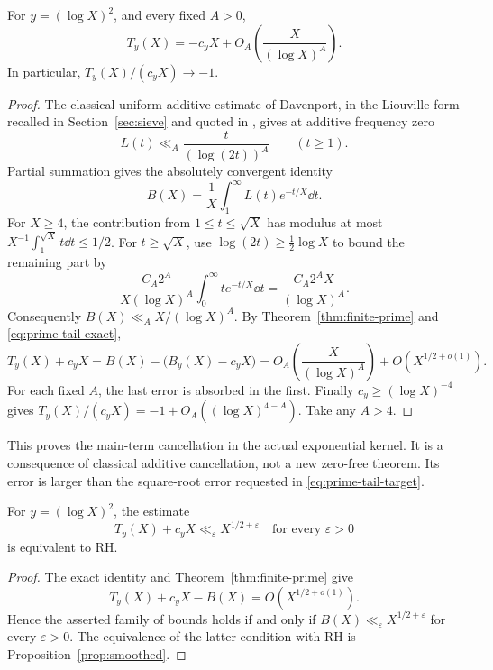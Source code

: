\begin{proposition}
\label{prop:prime-tail-logarithmic}
For \(y=(\log X)^2\), and every fixed \(A>0\),
\[
 T_y(X)=-c_yX+O_A\!\left(\frac{X}{(\log X)^A}\right).
\]
In particular, \(T_y(X)/(c_yX)\to-1\).
\end{proposition}
\begin{proof}
The classical uniform additive estimate of Davenport, in the
Liouville form recalled in Section~\ref{sec:sieve} and quoted in
\cite{mrt}, gives at additive frequency zero
\[
 L(t)\ll_A \frac{t}{(\log(2t))^A}
 \qquad(t\ge1).
\]
Partial summation gives the absolutely convergent identity
\[
 B(X)=\frac1X\int_1^\infty L(t)e^{-t/X}\dd t.
\]
For \(X\ge4\), the contribution from \(1\le t\le\sqrt X\)
has modulus at most \(X^{-1}\int_1^{\sqrt X}t\dd t\le1/2\).
For \(t\ge\sqrt X\), use
\(\log(2t)\ge\tfrac12\log X\) to bound the remaining part by
\[
 \frac{C_A2^A}{X(\log X)^A}
     \int_0^\infty te^{-t/X}\dd t
 =\frac{C_A2^AX}{(\log X)^A}.
\]
Consequently \(B(X)\ll_A X/(\log X)^A\).
By Theorem~\ref{thm:finite-prime} and
\eqref{eq:prime-tail-exact},
\[
 T_y(X)+c_yX
   =B(X)-\bigl(B_y(X)-c_yX\bigr)
   =O_A\!\left(\frac{X}{(\log X)^A}\right)
        +O(X^{1/2+o(1)}).
\]
For each fixed \(A\), the last error is absorbed in the first.
Finally \(c_y\ge(\log X)^{-4}\) gives
\(T_y(X)/(c_yX)=-1+O_A((\log X)^{4-A})\).
Take any \(A>4\).
\end{proof}

This proves the main-term cancellation in the actual exponential
kernel. It is a consequence of classical additive cancellation,
not a new zero-free theorem. Its error is larger than the
square-root error requested in \eqref{eq:prime-tail-target}.

\begin{proposition}
\label{prop:prime-tail-rh-equivalence}
For \(y=(\log X)^2\), the estimate
\[
 T_y(X)+c_yX\ll_\varepsilon X^{1/2+\varepsilon}
 \quad\text{for every }\varepsilon>0
\]
is equivalent to RH.
\end{proposition}
\begin{proof}
The exact identity and Theorem~\ref{thm:finite-prime} give
\[
 T_y(X)+c_yX-B(X)=O(X^{1/2+o(1)}).
\]
Hence the asserted family of bounds holds if and only if
\(B(X)\ll_\varepsilon X^{1/2+\varepsilon}\) for every
\(\varepsilon>0\). The equivalence of the latter condition
with RH is Proposition~\ref{prop:smoothed}.
\end{proof}

